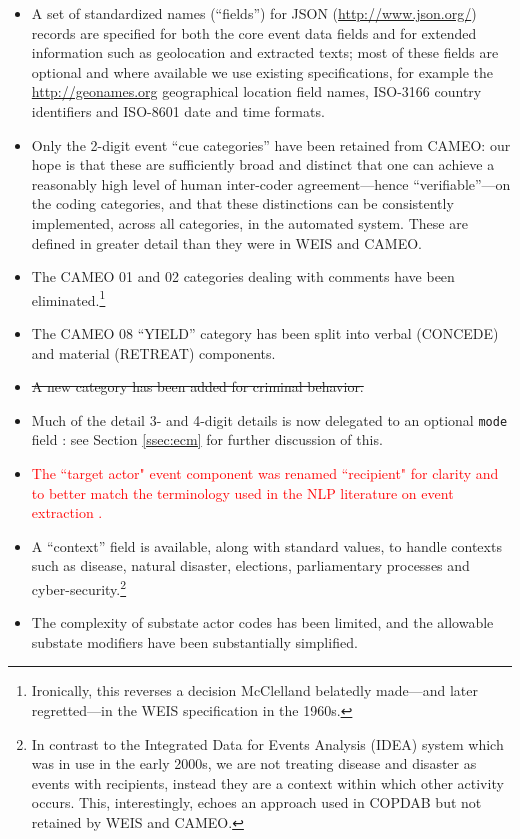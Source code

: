 \documentclass[11pt]{report}
\newcommand{\plcat}[1]{\textsf{#1}}
\newcommand{\fn}[1]{\footnote{#1}}
\newcommand{\andy}[1]{\textcolor{red}{#1}}
\begin{document}
\begin{itemize}
\item A set of standardized names (``fields'') for JSON (\url{http://www.json.org/}) records are specified for both the core event data fields and for extended information such as geolocation and extracted texts; most of these fields are optional and where available we use existing specifications, for example the \url{http://geonames.org} geographical location field names, ISO-3166 country identifiers and ISO-8601 date and time formats.
\item Only the 2-digit event ``cue categories'' have been retained from CAMEO: our hope is that these are sufficiently broad and distinct that one can achieve a reasonably high level of human inter-coder agreement---hence ``verifiable''---on the coding categories, and that these distinctions can be consistently implemented, across all categories, in the automated system. These are defined in greater detail than they were in WEIS and CAMEO.
\item The CAMEO 01 and 02 categories dealing with comments have been eliminated.\fn{Ironically, this reverses a decision McClelland belatedly made---and later regretted---in the WEIS specification in the 1960s.}
\item The CAMEO 08 ``YIELD'' category has been split into verbal (\plcat{CONCEDE}) and material (\plcat{RETREAT}) components. 
\item \sout{A new category has been added for criminal behavior.}
\item Much of the detail 3- and 4-digit details is now delegated to an optional \texttt{mode} field : see Section \ref{ssec:ecm} for further discussion of this.  
\item \andy{The ``target actor" event component was renamed ``recipient" for clarity and to better match the terminology used in the NLP literature on event extraction \citep{halterman2020extracting}.}
\item A ``context'' field is available, along with standard values, to handle contexts such as disease, natural disaster, elections, parliamentary processes and cyber-security.\fn{In contrast to the Integrated Data for Events Analysis (IDEA) \cite{BBOJT03} system which was in use in the early 2000s, we are not treating disease and disaster as events with recipients, instead they are a context within which other activity occurs. This, interestingly, echoes an approach used in COPDAB but not retained by WEIS and CAMEO.}
\item The complexity of substate actor codes has been limited, and the allowable substate modifiers have been substantially simplified. 

\end{itemize}
\end{document}
